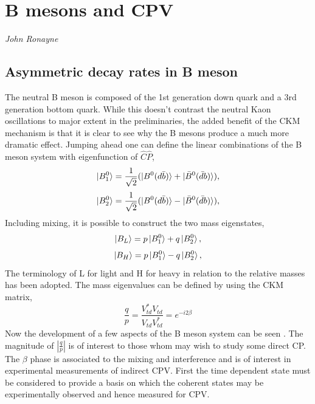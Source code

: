 %

\section{B mesons and CPV}
\vspace{-1.0em}
\begin{center}
\tiny{\textit{John Ronayne}}
\end{center}
\subsection{Asymmetric decay rates in B meson} 
The neutral B meson is composed of the 1st generation down quark and a 3rd generation bottom quark. While this doesn't contrast the neutral Kaon oscillations to major extent in the preliminaries, the added benefit of the CKM mechanism is that it is clear to see why the B mesons produce a much more dramatic effect. Jumping ahead one can define the linear combinations of the B meson system with eigenfunction of $\hat{C}\hat{P}$,
\begin{equation}\label{BPME1}
\ket{B^{0}_{1}}=\frac{1}{\sqrt{2}}(\ket{B^{0}(d\bar{b})}+\ket{\bar{B}^{0}(\bar{d}b)}),
\end{equation}
\begin{equation}\label{BPME2}
\ket{B^{0}_{2}}=\frac{1}{\sqrt{2}}(\ket{B^{0}(d\bar{b})}-\ket{\bar{B}^{0}(\bar{d}b)}),
\end{equation}
Including mixing, it is possible to construct the two mass eigenstates,
\begin{equation}\label{BPME3}
\ket{B_{L}}=p\ket{B^{0}_{1}}+q\ket{{B}^{0}_{2}},
\end{equation}
\begin{equation}\label{BPME4}
\ket{B_{H}}=p\ket{B^{0}_{1}}-q\ket{{B}^{0}_{2}},
\end{equation}
The terminology of L for light and H for heavy in relation to the relative masses has been adopted. The mass eigenvalues can be defined by using the CKM matrix,
\begin{equation}\label{BPME5}
\frac{q}{p}=\frac{V^{*}_{td}V_{td}}{V_{td}V^{*}_{td}}=e^{-i2\beta}
\end{equation}
Now the development of a few aspects of the B meson system can be seen \cite{B11}. The magnitude of  $\left| \frac{q}{p} \right|$ is of interest to those whom may wish to study some direct CP. The $\beta$ phase is associated to the mixing and interference and is of interest in experimental measurements of indirect CPV. First the time dependent state must be considered to provide a basis on which the coherent states may be experimentally observed and hence measured for CPV. 
\\


